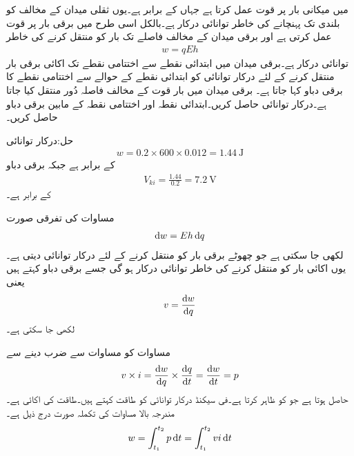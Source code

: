  میں میکانی بار  پر قوت  عمل کرتا ہے جہاں  کے برابر ہے۔یوں ثقلی میدان کے مخالف  کو  بلندی تک پہنچانے کی خاطر  توانائی درکار ہے۔بالکل اسی طرح   میں برقی بار  پر  قوت عمل کرتی ہے اور برقی میدان کے مخالف  فاصلے تک بار کو منتقل کرنے کی خاطر 
\begin{align}\label{مساوات_بنیادی_توانائی_دباو}
w=q E h
\end{align}
توانائی درکار ہے۔برقی میدان میں ابتدائی نقطے سے اختتامی نقطے تک اکائی برقی بار منتقل کرنے کے لئے درکار توانائی کو ابتدائی نقطے کے حوالے سے اختتامی نقطے کا برقی دباو کہا جاتا ہے۔
برقی میدان  میں  بار قوت کے مخالف  فاصلہ دُور منتقل کیا جاتا ہے۔درکار توانائی حاصل کریں۔ابتدائی نقطہ  اور اختتامی نقطہ  کے مابین برقی دباو حاصل کریں۔

حل:درکار توانائی
\begin{align*}
w=0.2 \times 600 \times 0.012=\SI{1.44}{\joule}
\end{align*}
کے برابر ہے جبکہ برقی دباو
\begin{align*}
V_{ki}=\frac{1.44}{0.2}=\SI{7.2}{\volt}
\end{align*}
کے برابر ہے۔

مساوات  کی تفرقی صورت 
\begin{align*}
\dif w= E h \dif q
\end{align*}
لکھی جا سکتی ہے جو چھوٹے برقی بار  کو منتقل کرنے کے لئے درکار توانائی  دیتی ہے۔یوں اکائی بار کو منتقل کرنے کی خاطر  توانائی درکار ہو گی جسے برقی دباو  کہتے ہیں یعنی
\begin{align}\label{مساوات_بنیادی_دباو_تعریف}
v=\frac{\dif w}{\dif q}
\end{align}
لکھی جا سکتی ہے۔

مساوات  کو مساوات  سے ضرب دینے سے
\begin{align}\label{مساوات_بنیادی_طاقت_مساوی_دباو_ضرب_رو}
v \times i = \frac{\dif w}{\dif q} \times \frac{\dif q}{\dif t}=\frac{\dif w}{\dif t}=p
\end{align}
حاصل ہوتا ہے جو   کو ظاہر کرتا ہے۔فی سیکنڈ درکار توانائی کو طاقت کہتے ہیں۔طاقت کی اکائی   ہے۔مندرجہ بالا مساوات کی تکملہ صورت درج ذیل ہے۔
\begin{align}
w=\int_{t_1}^{t_2} p \dif t=\int_{t_1}^{t_2} v i\dif t
\end{align}

